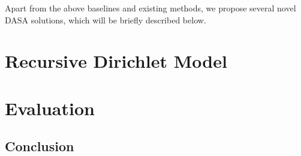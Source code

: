\documentclass[11pt]{article}
\begin{document}
Apart from the above baselines and existing methods, we propose
several novel DASA solutions, which will be briefly described below.


\section{Recursive Dirichlet Model}\label{method}


\section{Evaluation}\label{evaluation}


\subsection{Conclusion}\label{conclusion}



\end{document}
